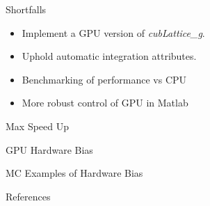 \documentclass[11pt]{beamer}
\begin{document}
\begin{frame}{Shortfalls}
\begin{itemize}
\item Implement a GPU version of \textit{cubLattice\_g}.
\item Uphold automatic integration attributes.
\item Benchmarking of performance vs CPU
\item More robust control of GPU in Matlab
\end{itemize}
\end{frame}

\begin{frame}{Max Speed Up}

\end{frame}

\begin{frame}{GPU Hardware Bias}

\end{frame}

\begin{frame}{MC Examples of Hardware Bias}

\end{frame}
\begin{frame}{References}


\end{frame}
\end{document}
